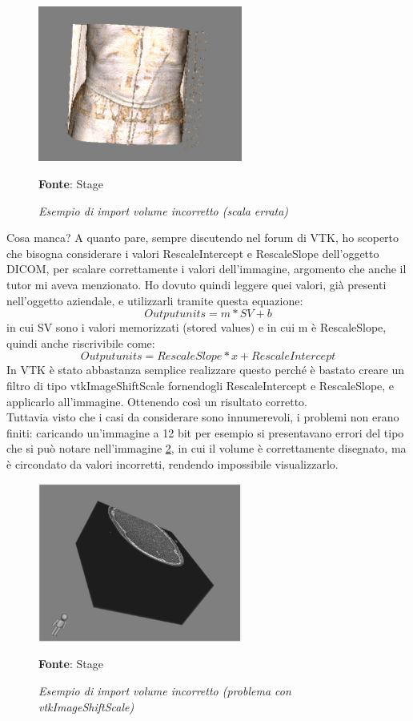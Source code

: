\begin{figure}[h]
    \centering
    \includegraphics[width=0.6\textwidth]{immagini/svolgimento/volumebrokenscale.jpeg}
    \caption{\textit{Esempio di import volume incorretto (scala errata)}}
    \textbf{Fonte}: Stage
    \label{fig: Volume Wrong Scale}
\end{figure}

Cosa manca? A quanto pare, sempre discutendo nel forum di VTK, ho scoperto che bisogna considerare i valori RescaleIntercept e RescaleSlope dell'oggetto DICOM, per scalare correttamente i valori dell'immagine, argomento che anche il tutor mi aveva menzionato. Ho dovuto quindi leggere quei valori, già presenti nell'oggetto aziendale, e utilizzarli tramite questa equazione:
\[ Output units = m*SV+b \]
in cui SV sono i valori memorizzati (stored values) e in cui m è RescaleSlope, quindi anche riscrivibile come: 
\[ Output units = RescaleSlope * x + RescaleIntercept \]
In VTK è stato abbastanza semplice realizzare questo perché è bastato creare un filtro di tipo vtkImageShiftScale fornendogli RescaleIntercept e RescaleSlope, e applicarlo all'immagine. Ottenendo così un risultato corretto.
\\
Tuttavia visto che i casi da considerare sono innumerevoli, i problemi non erano finiti: caricando un'immagine a 12 bit per esempio si presentavano errori del tipo che si può notare nell'immagine \ref{fig: Volume Wrong Value}, in cui il volume è correttamente disegnato, ma è circondato da valori incorretti, rendendo impossibile visualizzarlo.

\begin{figure}[h]
    \centering
    \includegraphics[width=0.6\textwidth]{immagini/svolgimento/volumebroken12bit.png}
    \caption{\textit{Esempio di import volume incorretto (problema con vtkImageShiftScale)}}
    \textbf{Fonte}: Stage
    \label{fig: Volume Wrong Value}
\end{figure}

